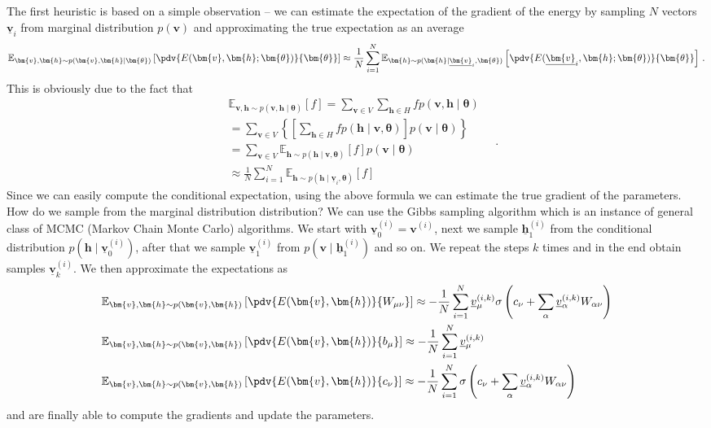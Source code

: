 \documentclass[a5paper]{article}
\begin{document}
The first heuristic is based on a simple observation -- we can estimate the expectation of the
gradient of the energy by sampling \(N\) vectors \(\underline{\bm{v}}_i\) from marginal
distribution \(p(\bm{v})\) and approximating the true expectation as an average
\[
   \mathbb{E}_{\bm{v}, \bm{h} \sim p(\bm{v},\bm{h} \mid \bm{\theta})}\left[\pdv{E(\bm{v},\bm{h}; \bm{\theta})}{\bm{\theta}}\right] 
   \approx \frac{1}{N} \sum_{i=1}^N \mathbb{E}_{\bm{h} \sim p(\bm{h} \mid \underline{\bm{v}}_i, \bm{\theta})}\left[\pdv{E(\underline{\bm{v}}_i,\bm{h}; \bm{\theta})}{\bm{\theta}}\right]\,. 
\]
This is obviously due to the fact that
\[
\begin{split}
   &\mathbb{E}_{\bm{v}, \bm{h} \sim p(\bm{v},\bm{h} \mid \bm{\theta})}\left[ f \right] = \sum_{\bm{v} \in V} \sum_{\bm{h} \in H} f p(\bm{v}, \bm{h} \mid \bm{\theta}) \\
   &= \sum_{\bm{v} \in V} \left\{ \left[ \sum_{\bm{h} \in H} f p(\bm{h} \mid \bm{v}, \bm{\theta}) \right] p(\bm{v} \mid \bm{\theta}) \right\}\\
   &= \sum_{\bm{v} \in V} \mathbb{E}_{\bm{h} \sim p(\bm{h} \mid \bm{v}, \bm{\theta})}[f] p(\bm{v} \mid \bm{\theta})\\
   &\approx \frac{1}{N} \sum_{i=1}^N \mathbb{E}_{\bm{h} \sim p(\bm{h} \mid \underline{\bm{v}}_i, \bm{\theta})}[f]
\end{split}\quad.
\]
Since we can easily compute the conditional expectation, using the above formula we can estimate the
true gradient of the parameters. How do we sample from the marginal distribution distribution? We
can use the Gibbs sampling algorithm which is an instance of general class of MCMC (Markov Chain
Monte Carlo) algorithms. We start with \(\underline{\bm{v}}_0^{(i)} = \bm{v}^{(i)}\), next we sample
\(\underline{\bm{h}}_1^{(i)}\) from the conditional distribution \(p(\bm{h} \mid
\underline{\bm{v}}_0^{(i)})\), after that we sample \(\underline{\bm{v}}_1^{(i)}\) from \(p(\bm{v}
\mid \underline{\bm{h}}_1^{(i)})\) and so on. We repeat the steps \(k\) times and in the end obtain
samples \(\underline{\bm{v}}_k^{(i)}\). We then approximate the expectations as
\[
\begin{split}
&\mathbb{E}_{\bm{v},\bm{h} \sim p(\bm{v},\bm{h})}\left[ \pdv{E(\bm{v}, \bm{h})}{W_{\mu\nu}}\right] \approx - \frac{1}{N}\sum_{i=1}^N \underline{v}_\mu^{(i,k)} \sigma\left(c_\nu + \sum_\alpha \underline{v}_\alpha^{(i,k)} W_{\alpha\nu}\right)\\
&\mathbb{E}_{\bm{v},\bm{h} \sim p(\bm{v},\bm{h})}\left[ \pdv{E(\bm{v}, \bm{h})}{b_{\mu}}\right] \approx - \frac{1}{N}\sum_{i=1}^N \underline{v}_\mu^{(i,k)}\\
&\mathbb{E}_{\bm{v},\bm{h} \sim p(\bm{v},\bm{h})}\left[ \pdv{E(\bm{v}, \bm{h})}{c_\nu}\right] \approx - \frac{1}{N}\sum_{i=1}^N \sigma\left(c_\nu + \sum_\alpha \underline{v}_\alpha^{(i,k)} W_{\alpha\nu}\right)
\end{split}
\]
and are finally able to compute the gradients and update the parameters.
\end{document}
